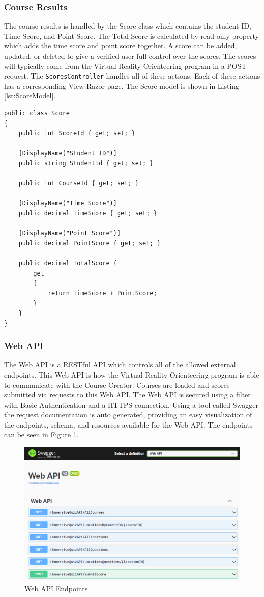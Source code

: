 \subsubsection{Course Results}
The course results is handled by the Score class which contains the student ID, Time Score, and Point Score. The Total Score is calculated by read only property which adds the time score and point score together.  A score can be added, updated, or deleted to give a verified user full control over the scores. The scores will typically come from the Virtual Reality Orienteering program in a POST request. The \lstinline{ScoresController} handles all of these actions. Each of these actions has a corresponding View Razor page. The Score model is shown in Listing \ref{lst:ScoreModel}.
\begin{lstlisting}[caption=Score Model, label=lst:ScoreModel]
public class Score
{
	public int ScoreId { get; set; }
	
	[DisplayName("Student ID")]
	public string StudentId { get; set; }
	
	public int CourseId { get; set; }
	
	[DisplayName("Time Score")]
	public decimal TimeScore { get; set; }
	
	[DisplayName("Point Score")]
	public decimal PointScore { get; set; }
	
	public decimal TotalScore { 
		get 
		{
			return TimeScore + PointScore;
		}
	}
}
\end{lstlisting}
\subsubsection{Web API}
The Web API is a RESTful API which controls all of the allowed external endpoints. This Web API is how the Virtual Reality Orienteering program is able to communicate with the Course Creator. Courses are loaded and scores submitted via requests to this Web API. The Web API is secured using a filter with Basic Authentication and a HTTPS connection. Using a tool called Swagger the request documentation is auto generated, providing an easy visualization of the endpoints, schema, and resources available for the Web API. The endpoints can be seen in Figure \ref{fig:WebApiEndpoints}.
\begin{figure}[htb]
	\centering
	\includegraphics[width=.9\textwidth]{Implementation/assets/web-api-endpoints.png}
	\caption[Web API Endpoints]{\label{fig:WebApiEndpoints}Web API Endpoints}
\end{figure}


